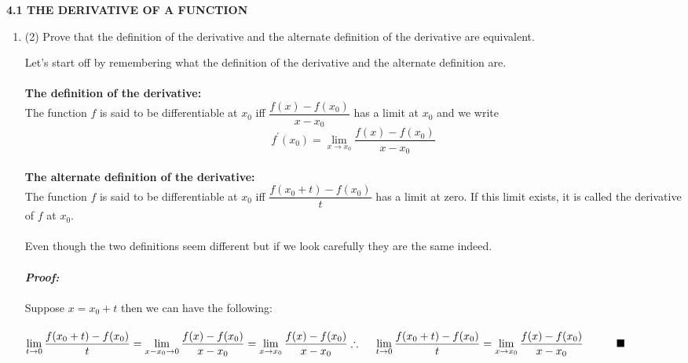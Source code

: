 \documentclass[fleqn]{article}
\begin{document}
  \textbf{4.1 THE DERIVATIVE OF A FUNCTION }
  \begin{enumerate}
    \item (2) Prove that the definition of the derivative and the alternate definition of the derivative are
    equivalent.

      \textcolor{hwColor}{
        \hspace{15pt} Let's start off by remembering what the definition of the derivative and the alternate definition are.
        \\
        \\
        \textbf{The definition of the derivative:}
        \\
        The function $f$ is said to be differentiable at $x_0$ iff $\dfrac{f(x)-f(x_0)}{x-x_0}$ has a limit at $x_0$
        and we write $$f^'(x_0)=\lim\limits_{x \to x_0} \dfrac{f(x)-f(x_0)}{x-x_0}$$
        \\
        \textbf{The alternate definition of the derivative:}
        \\
        The function $f$ is said to be differentiable at $x_0$ iff $\dfrac{f(x_0+t)-f(x_0)}{t}$ has a limit at 
        zero. If this limit exists, it is called the derivative of $f$ at $x_0$.
        \\
        \\
        Even though the two definitions seem different but if we look carefully they are the same indeed.
        \\
        \\
        \emph{\textbf{Proof:}}
        \\
        \\
        Suppose $x=x_0+t$ then we can have the following:
        \\
        \\
        $
          \lim\limits_{t \to 0} \dfrac{f(x_0+t)-f(x_0)}{t}
          \\
          \\
          =\lim\limits_{x-x_0 \to 0} \dfrac{f(x)-f(x_0)}{x-x_0}
          \\
          \\
          =\lim\limits_{x \to x_0} \dfrac{f(x)-f(x_0)}{x-x_0}
          \\
          \\
          \\
          \therefore ~~~~ \lim\limits_{t \to 0} \dfrac{f(x_0+t)-f(x_0)}{t}=\lim\limits_{x \to x_0} \dfrac{f(x)-f(x_0)}{x-x_0} ~~~~~~~~~ \blacksquare
          \\
        $
      }


\end{enumerate}
\end{document}
